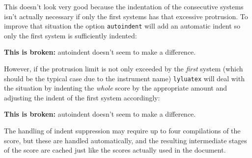 \documentclass{scrartcl}
\begin{document}

This doesn't look very good because the indentation of the consecutive systems
isn't actually necessary if only the first systems has that excessive
protrusion. To improve that situation the option \texttt{autoindent} will add an
automatic indent so only the first system is sufficiently indented:

\textbf{This is broken:} autoindent doesn't seem to make a difference.


However, if the protrusion limit is not only exceeded by the \emph{first} system
(which should be the typical case due to the instrument name) \texttt{lyluatex}
will deal with the situation by indenting the \emph{whole} score by the
appropriate amount and adjusting the indent of the first system accordingly:

\textbf{This is broken:} autoindent doesn't seem to make a difference.



The handling of indent suppression may require up to four compilations of the
score, but these are handled automatically, and the resulting intermediate
stages of the score are cached just like the scores actually used in the
document.
\end{document}
